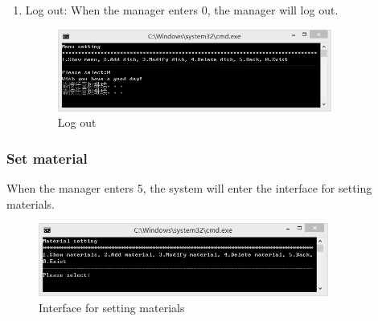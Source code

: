 \documentclass{article}
\begin{document}
\begin{enumerate}
    \item Log out:\newline
    When the manager enters 0, the manager will log out.
        \begin{figure}[H]
        \centering
        \includegraphics[width=0.85\textwidth]{D/D0.jpg}
        \caption{Log out}
        \end{figure}
    
\end{enumerate}


\subsubsection{Set material}
When the manager enters 5, the system will enter the interface for setting materials.
\begin{figure}[H]
    \centering
    \includegraphics[width=0.85\textwidth]{E/02.jpg}
    \caption{Interface for setting materials}
\end{figure}
\end{document}
